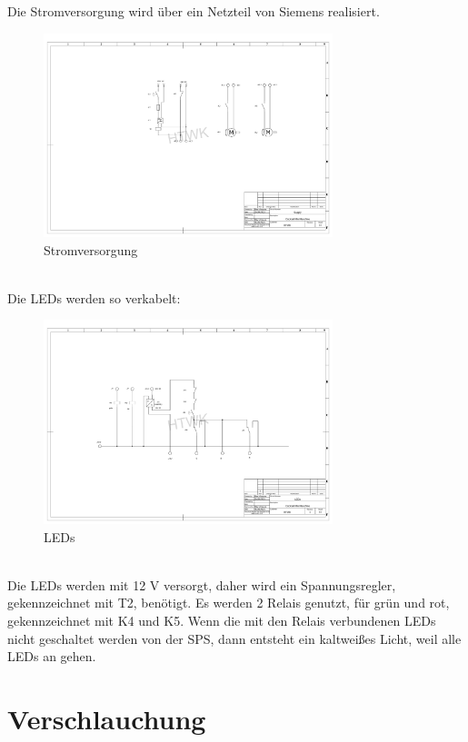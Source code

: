\documentclass[10pt,a4paper]{report}
\begin{document}
	\newpage
	Die Stromversorgung wird über ein Netzteil von Siemens realisiert.\\ 
	\begin{figure}[htb]
		\includegraphics[width=0.75\textwidth]{Supply (V2) .pdf}
		\centering
		\caption{Stromversorgung}
	\end{figure}
	\\Die LEDs werden so verkabelt:\\
	\begin{figure}[htb]
		\includegraphics[width=0.75\textwidth]{LEDs (V2).pdf}
		\centering
		\caption{LEDs}
	\end{figure}
	\\Die LEDs werden mit 12 V versorgt, daher wird ein Spannungsregler, gekennzeichnet mit T2, benötigt. Es werden 2 Relais genutzt, für grün und rot, gekennzeichnet mit K4 und K5. Wenn die mit den Relais verbundenen LEDs nicht geschaltet werden von der SPS, dann entsteht ein kaltweißes Licht, weil alle LEDs an gehen.
	 
	\chapter{Verschlauchung}
	
\end{document}
